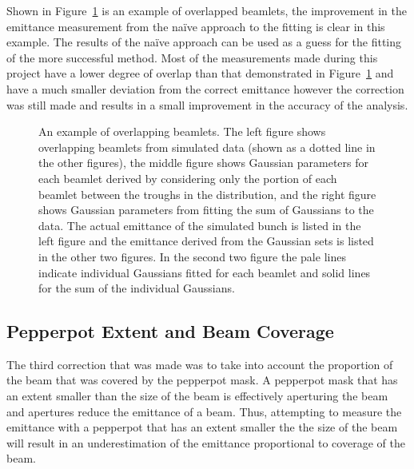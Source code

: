 Shown in Figure~\ref{figure:overlap_example} is an example of overlapped beamlets, the improvement in the emittance measurement from the na\"ive approach to the fitting is clear in this example.
The results of the na\"ive approach can be used as a guess for the fitting of the more successful method.
Most of the measurements made during this project have a lower degree of overlap than that demonstrated in Figure~\ref{figure:overlap_example} and have a much smaller deviation from the correct emittance however the correction was still made and results in a small improvement in the accuracy of the analysis.

\begin{figure}
    \center
    
    \caption[An example of overlapping beamlets.]{An example of overlapping beamlets.
    The left figure shows overlapping beamlets from simulated data (shown as a dotted line in the other figures), the middle figure shows Gaussian parameters for each beamlet derived by considering only the portion of each beamlet between the troughs in the distribution, and the right figure shows Gaussian parameters from fitting the sum of Gaussians to the data.
    The actual emittance of the simulated bunch is listed in the left figure and the emittance derived from the Gaussian sets is listed in the other two figures.
    In the second two figure the pale lines indicate individual Gaussians fitted for each beamlet and solid lines for the sum of the individual Gaussians.}
    \label{figure:overlap_example}
\end{figure}


\subsection{Pepperpot Extent and Beam Coverage}
The third correction that was made was to take into account the proportion of the beam that was covered by the pepperpot mask.
A pepperpot mask that has an extent smaller than the size of the beam is effectively aperturing the beam and apertures reduce the emittance of a beam.
Thus, attempting to measure the emittance with a pepperpot that has an extent smaller the the size of the beam will result in an underestimation of the emittance proportional to coverage of the beam.

